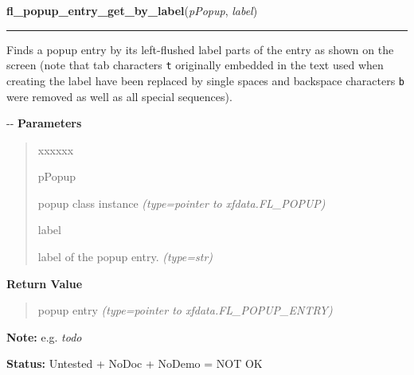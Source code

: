     \label{xformslib:flpopup:fl_popup_entry_get_by_label}

    \vspace{0.5ex}

\hspace{.8\funcindent}\begin{boxedminipage}{\funcwidth}

    \raggedright \textbf{fl\_popup\_entry\_get\_by\_label}(\textit{pPopup}, \textit{label})

    \vspace{-1.5ex}

    \rule{\textwidth}{0.5\fboxrule}
\setlength{\parskip}{2ex}

Finds a popup entry by its left-flushed label parts of the entry as
shown on the screen (note that tab characters \texttt{t} originally embedded
in the text used when creating the label have been replaced by single
spaces and backspace characters \texttt{b} were removed as well as all special
sequences).

-{}-
\setlength{\parskip}{1ex}
      \textbf{Parameters}
      \vspace{-1ex}

      \begin{quote}
        \begin{Ventry}{xxxxxx}

          \item[pPopup]


popup class instance
            {\it (type=pointer to xfdata.FL\_POPUP)}

          \item[label]


label of the popup entry.
            {\it (type=str)}

        \end{Ventry}

      \end{quote}

      \textbf{Return Value}
    \vspace{-1ex}

      \begin{quote}

popup entry
      {\it (type=pointer to xfdata.FL\_POPUP\_ENTRY)}

      \end{quote}

\textbf{Note:} 
e.g. \emph{todo}


\textbf{Status:} 
Untested + NoDoc + NoDemo = NOT OK


    \end{boxedminipage}

